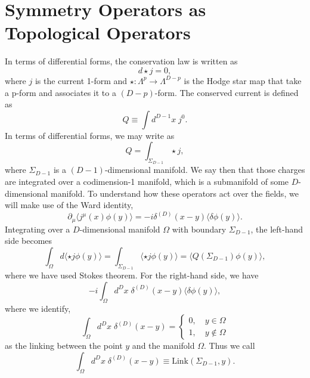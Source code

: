 \documentclass{article}
\begin{document}
\section{Symmetry Operators as Topological Operators}
In terms of differential forms, the conservation law is written as
\begin{equation}
	d\star j=0,
\end{equation}
where $j$ is the current 1-form and $\star:\Lambda^p\to \Lambda^{D-p}$   is the Hodge star map that take a p-form and associates it to a $(D-p)$-form. The conserved current is defined as
\begin{equation}
	Q\equiv\int d^{D-1}x\;j^0.
\end{equation}
In terms of differential forms, we may write as
\begin{equation}
	Q=\int_{\Sigma_{D-1}}\star j,
\end{equation}
where $\Sigma_{D-1}$  is a $(D-1)$-dimensional manifold. We say then that those charges are integrated over a codimension-1 manifold, which is a submanifold of some $D$-dimensional manifold.  To understand how these operators act over the fields, we will make use of the Ward identity,
\begin{equation}
	\partial_\mu\langle j^\mu(x)\phi(y)\rangle=-i\delta^{(D)}(x-y)\langle\delta\phi(y)\rangle.
\end{equation}
Integrating over a $D$-dimensional manifold $\Omega$  with boundary $\Sigma_{D-1}$, the left-hand side becomes
\begin{equation}
	\int_{\Omega}d\langle\star j\phi(y)\rangle=\int_{\Sigma_{D-1}}\langle\star j\phi(y)\rangle=\langle Q(\Sigma_{D-1})\phi(y)\rangle,
\end{equation}
where we have used Stokes theorem. For the right-hand side, we have
\begin{equation}
	-i\int_{\Omega}d^Dx\;\delta^{(D)}(x-y)\langle\delta\phi(y)\rangle,
\end{equation}
where we identify,
\begin{equation}
	\int_{\Omega}d^Dx\;\delta^{(D)}(x-y)=\begin{cases}0,\quad y\in\Omega\\1,\quad y\not\in\Omega\end{cases}
\end{equation}
as the linking between the point $y$ and the manifold $\Omega$. Thus we call  
\begin{equation}
	\int_{\Omega}d^Dx\;\delta^{(D)}(x-y)\equiv \text{Link}(\Sigma_{D-1},y).
\end{equation}
\end{document}
